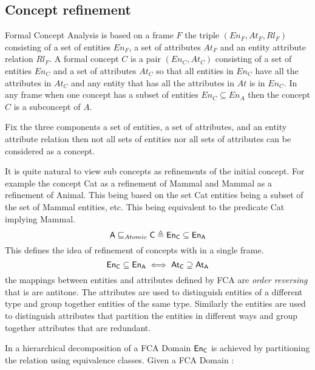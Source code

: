 \subsection{Concept refinement} \label{sec:Cref}

 Formal Concept Analysis is based on a frame $F$ the triple $(En_F, At_F, Rl_F)$ consisting of a set of entities $En_F$, a set of  attributes $At_F$ and an entity attribute relation $Rl_F$.  A formal concept $C$ is a pair $(En_C,At_C)$  consisting of a set of entities $En_C$ and a set of  attributes $At_C$ so that all entities  in $En_C$ have all the attributes in $At_C$ and any entity that has all  the attributes in $At$ is in $En_C$.  In any frame when  one concept has a subset of entities  $En_C \subseteq En_A$ then the concept $C$ is a subconcept of $A$.

Fix the three components a set of entities, a set of attributes, and an entity attribute relation then not all sets of entities nor all sets of attributes can be considered as a concept. 

It is quite natural to view sub concepts as refinements of the initial concept. For example the concept {\sf Cat} as a refinement of {\sf Mammal} and {\sf Mammal} as a refinement of {\sf Animal}. This being based on the set {\sf Cat} entities being a subset of the set of {\sf Mammal} entities, etc. This being equivalent to the predicate {\sf Cat} implying {\sf Mammal}.
$$
{\sf A} \sqsubseteq_{Atomic} {\sf  C} \triangleq   {\sf En_C} \subseteq  {\sf  En_A}
$$
This defines the idea of refinement of concepts with in a single frame.
$$
{\sf En_C} \subseteq  {\sf  En_A} \iff   {\sf At_C} \supseteq  {\sf  At_A}
$$
the mappings between entities and attributes defined by FCA are \emph{order reversing} that is are antitone. The attributes are used to distinguish entities of a different type and group together entities of the same type. Similarly the entities are used to distinguish attributes that partition the entities in different ways and group together attributes that are redundant. 


In \cite{HFCA05} a hierarchical decomposition of a FCA Domain ${\sf En_C}$ is achieved by  partitioning the relation using  equivalence classes. Given  a FCA Domain :

